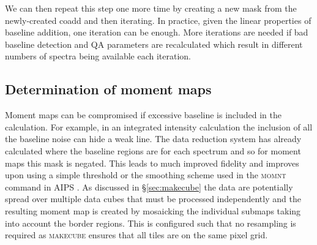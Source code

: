 \documentclass[final,authoryear,5p,times,twocolumn]{elsarticle}
\begin{document}
We can then repeat this step one more time by creating a new
mask from the newly-created coadd and then iterating. In practice,
given the linear properties of baseline addition, one iteration can be
enough. More iterations are needed if bad baseline detection and QA
parameters are recalculated which result in different numbers of
spectra being available each iteration.

\subsection{Determination of moment maps}

Moment maps can be compromised if excessive baseline is included in
the calculation. For example, in an integrated intensity calculation
the inclusion of all the baseline noise can hide a weak line. The data
reduction system has already calculated where the baseline regions are
for each spectrum and so for moment maps this mask is negated. This
leads to much improved fidelity and improves upon using a simple threshold or
the smoothing scheme used in the \textsc{momnt} command in AIPS
\cite[][ascl:9911.003]{2003ASSL..285..109G}. As discussed in \S \ref{sec:makecube}
the data are potentially spread over multiple data cubes that must be
processed independently and the resulting moment map is created by
mosaicking the individual submaps taking into account the border
regions. This is configured such that no resampling is required as
\textsc{makecube} ensures that all tiles are on the same pixel grid.
\end{document}
